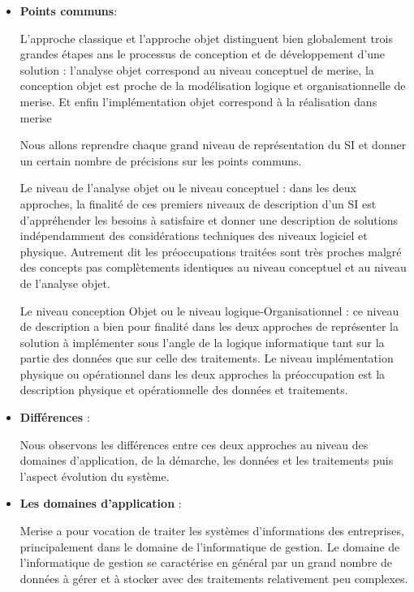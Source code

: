 \vspace{1em}
\begin{itemize}
	\setlength\itemsep{1em}
	\item \textbf{Points communs}:

	      L’approche classique et l’approche objet distinguent bien globalement trois grandes étapes
	      ans le processus de conception et de développement d’une solution : l’analyse objet correspond
	      au niveau conceptuel de merise, la conception objet est proche de la modélisation logique et
	      organisationnelle de merise. Et enfin l’implémentation objet correspond à la réalisation dans
	      merise

	      Nous allons reprendre chaque grand niveau de représentation du SI et donner un certain nombre
	      de précisions sur les points communs.

	      Le niveau de l’analyse objet ou le niveau conceptuel : dans les deux approches, la finalité de ces
	      premiers niveaux de description d’un SI est d’appréhender les besoins à satisfaire et donner une
	      description de solutions indépendamment des considérations techniques des niveaux logiciel et
	      physique. Autrement dit les préoccupations traitées sont très proches malgré des concepts pas
	      complètements identiques au niveau conceptuel et au niveau de l’analyse objet.

	      Le niveau conception Objet ou le niveau logique-Organisationnel : ce niveau de description a
	      bien pour finalité dans les deux approches de représenter la solution à implémenter sous l’angle
	      de la logique informatique tant sur la partie des données que sur celle des traitements.
	      Le niveau implémentation physique ou opérationnel dans les deux approches la préoccupation
	      est la description physique et opérationnelle des données et traitements.

	\item \textbf{Différences} :

	      Nous observons les différences entre ces deux approches au niveau des domaines d’application,
	      de la démarche, les données et les traitements puis l’aspect évolution du système.

	\item \textbf{Les domaines d’application} :

	      Merise a pour vocation de traiter les systèmes d’informations des entreprises, principalement
	      dans le domaine de l’informatique de gestion. Le domaine de l’informatique de gestion se
	      caractérise en général par un grand nombre de données à gérer et à stocker avec des traitements
	      relativement peu complexes.


\end{itemize}
